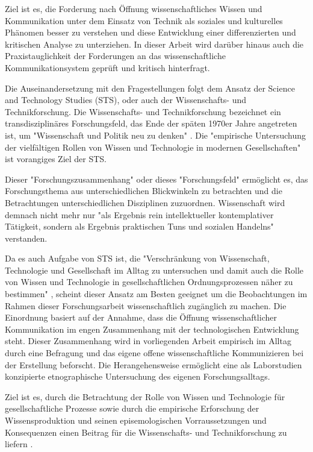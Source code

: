 Ziel ist es, die Forderung nach Öffnung wissenschaftliches Wissen und Kommunikation unter dem Einsatz von Technik als soziales und kulturelles Phänomen besser zu verstehen und diese Entwicklung einer differenzierten und kritischen Analyse zu unterziehen. In dieser Arbeit wird darüber hinaus auch die Praxistauglichkeit der Forderungen an das wissenschaftliche Kommunikationsystem geprüft und kritisch hinterfragt.

Die Auseinandersetzung mit den Fragestellungen folgt dem Ansatz der Science and Technology Studies (STS), oder auch der Wissenschafts- und Technikforschung. Die Wissenschafts- und Technikforschung bezeichnet ein transdisziplinäres Forschungsfeld, das Ende der späten 1970er Jahre angetreten ist, um "Wissenschaft und Politik neu zu denken" \cite{Potthast_2010}. Die "empirische Untersuchung der vielfältigen Rollen von Wissen und Technologie in modernen Gesellschaften"\cite{beck_2014_science} ist vorangiges Ziel der STS.

Dieser "Forschungszusammenhang"\cite{Potthast_2010} oder dieses "Forschungsfeld" \cite{beck_2014_science} ermöglicht es, das Forschungsthema aus unterschiedlichen Blickwinkeln zu betrachten und die Betrachtungen unterschiedlichen Disziplinen zuzuordnen. Wissenschaft wird demnach nicht mehr nur "als Ergebnis rein intellektueller kontemplativer Tätigkeit, sondern als Ergebnis praktischen Tuns und sozialen Handelns" verstanden.

Da es auch Aufgabe von STS ist, die "Verschränkung von Wissenschaft, Technologie und Gesellschaft im Alltag zu untersuchen und damit auch die Rolle von Wissen und Technologie in gesellschaftlichen Ordnungsprozessen näher zu bestimmen" \cite{beck_2014_science}, scheint dieser Ansatz am Besten geeignet um die Beobachtungen im Rahmen dieser Forschungsarbeit wissenschaftlich zugänglich zu machen. Die Einordnung basiert auf der Annahme, dass die Öffnung wissenschaftlicher Kommunikation im engen Zusammenhang mit der technologischen Entwicklung steht. Dieser Zusammenhang wird in vorliegenden Arbeit empirisch im Alltag durch eine Befragung und das eigene offene wissenschaftliche Kommunizieren bei der Erstellung beforscht. Die Herangehensweise ermöglicht eine als Laborstudien konzipierte etnographische Untersuchung des eigenen Forschungsalltags.

Ziel ist es, durch die Betrachtung der Rolle von Wissen und Technologie für gesellschaftliche Prozesse sowie durch die empirische Erforschung der Wissensproduktion und seinen episemologischen Vorraussetzungen und Konsequenzen einen Beitrag für die Wissenschafts- und Technikforschung zu liefern \cite{beck_2014_science}.
